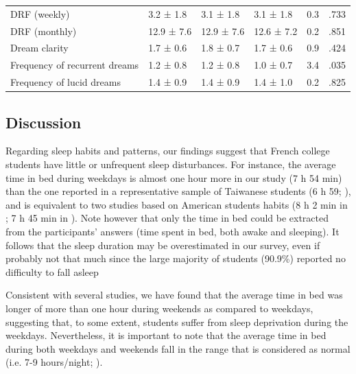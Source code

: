 \begin{table}[!htb]
\begin{tabularx}{\textwidth}{bXXXll}
    DRF (weekly)                   & 3.2 ± 1.8  & 3.1 ± 1.8  & 3.1 ± 1.8  & 0.3    & .733 \\
    DRF (monthly)                  & 12.9 ± 7.6 & 12.9 ± 7.6 & 12.6 ± 7.2 & 0.2    & .851 \\
    Dream clarity                  & 1.7 ± 0.6  & 1.8 ± 0.7  & 1.7 ± 0.6  & 0.9    & .424 \\
    Frequency of recurrent dreams  & 1.2 ± 0.8  & 1.2 ± 0.8  & 1.0 ± 0.7  & 3.4    & .035 \\
    Frequency of lucid dreams      & 1.4 ± 0.9  & 1.4 ± 0.9  & 1.4 ± 1.0  & 0.2    & .825 \\ \bottomrule
    \end{tabularx}
\end{table}

\subsection*{Discussion}
\label{res:survey:discussion}

Regarding sleep habits and patterns, our findings suggest that French college students have little or unfrequent sleep disturbances. For instance, the average time in bed during weekdays is almost one hour more in our study (7 h 54 min) than the one reported in a representative sample of Taiwanese students (6 h 59; \citealp{tsai_sleep_2004}), and is equivalent to two studies based on American students habits (8 h 2 min in \citealp{buboltz_sleep_2001}; 7 h 45 min in \citealp{lund_sleep_2010}). Note however that only the time in bed could be extracted from the participants’ answers (time spent in bed, both awake and sleeping). It follows that the sleep duration may be overestimated in our survey, even if probably not that much since the large majority of students (90.9\%) reported no difficulty to fall asleep

Consistent with several studies, we have found that the average time in bed was longer of more than one hour during weekends as compared to weekdays, suggesting that, to some extent, students suffer from sleep deprivation during the weekdays. Nevertheless, it is important to note that the average time in bed during both weekdays and weekends fall in the range that is considered as normal (i.e. 7-9 hours/night; \citealp{hirshkowitz_normal_2004}).

